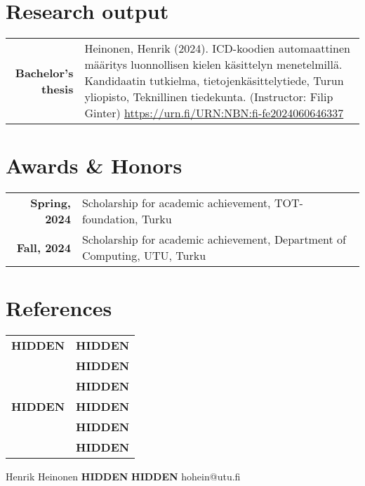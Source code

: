 \documentclass[lighthipster]{simplehipstercv}
\newlength{\rightcolwidth}
\begin{document}
\begin{paracol}{2}
\section*{Research output}    
\begin{tabular}{>{\footnotesize\bfseries}r >{\footnotesize}p{}}
    Bachelor's thesis & Heinonen, Henrik (2024). ICD-koodien automaattinen määritys luonnollisen kielen käsittelyn menetelmillä. Kandidaatin tutkielma, tietojenkäsittelytiede, Turun yliopisto, Teknillinen tiedekunta. (Instructor: Filip Ginter) \href{https://urn.fi/URN:NBN:fi-fe2024060646337}{https://urn.fi/URN:NBN:fi-fe2024060646337} \\
\end{tabular}

\section*{Awards \& Honors}    
\begin{tabular}{>{\footnotesize\bfseries}r >{\footnotesize}p{}}
    Spring, 2024 & Scholarship for academic achievement, TOT-foundation, Turku \\
    Fall, 2024 & Scholarship for academic achievement, Department of Computing, UTU, Turku \\
\end{tabular}


\section*{References}
\begin{tabular}{>{\footnotesize\bfseries}r >{\footnotesize}p{}}
    \textbf{HIDDEN} & \textbf{HIDDEN} \\
    & \textbf{HIDDEN}\\
    & \textbf{HIDDEN}\\
    \textbf{HIDDEN} & \textbf{HIDDEN} \\
    & \textbf{HIDDEN}\\
    & \textbf{HIDDEN}
\end{tabular}





\vfill{} %

\setlength{\parindent}{0pt}
\begin{minipage}[t]{\rightcolwidth}
\begin{center}\fontfamily{\sfdefault}\selectfont \color{black!70}
{\small Henrik Heinonen  \textbf{HIDDEN}   \textbf{HIDDEN} \newline{} hohein@utu.fi
}
\end{center}
\end{minipage}

\end{paracol}
\end{document}
